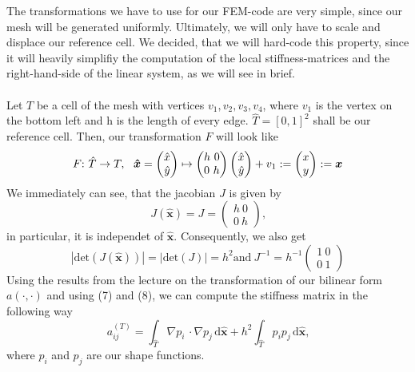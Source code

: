 \documentclass[a4paper,12pt]{article}
\begin{document}
The transformations we have to use for our FEM-code are very simple, since our mesh will be generated uniformly. Ultimately, we will only have to scale and displace our reference cell. We decided, that we will hard-code this property, since it will heavily simplifiy the computation of the local stiffness-matrices and the right-hand-side of the linear system, as we will see in brief.
\\ \\
Let $T$ be a cell of the mesh with vertices $v_1,v_2,v_3,v_4$, where $v_1$ is the vertex on the bottom left and h is the length of every edge. $\hat T = [0,1]^2$ shall be our reference cell. Then, our transformation $F$ will look like 
\[F \smash : \  \hat T \rightarrow T, \ \ \bm{\hat x}=\begin{pmatrix}\hat x \\ \hat y \end{pmatrix} \mapsto \begin{pmatrix}h \ 0 \\ 0 \ h\end{pmatrix} \begin{pmatrix}\hat x \\ \hat y \end{pmatrix} + v_1 := \begin{pmatrix}x\\y\end{pmatrix} := \bm{x}\]
We immediately can see, that the jacobian $J$ is given by
\begin{equation}
J(\bm{\hat x})=J=\begin{pmatrix}h \ 0\\0 \ h\end{pmatrix}\mbox{,}
\end{equation}
in particular, it is independet of $\bm{\hat x}$. Consequently, we also get
\begin{equation}
|\mbox{det}(J(\bm{\hat x}))|=|\mbox{det}(J)|=h^2\mbox{and} \ J^{-1}=h^{-1}\begin{pmatrix}1 \ 0 \\ 0 \ 1\end{pmatrix}
\end{equation}
Using the results from the lecture on the transformation of our bilinear form $a(\cdotp, \cdot)$ and using (7) and (8), we can compute the stiffness matrix in the following way
\[a^{(T)}_{ij} = \int_{\hat T}\nabla p_i \,\cdotp \nabla p_j\,\mbox{d}\bm{\hat x} + h^2\int_{\hat T}p_i p_j\,\mbox{d}\bm{\hat x}\mbox{,}\]
where $p_i$ and $p_j$ are our shape functions.\\ \\
\end{document}
